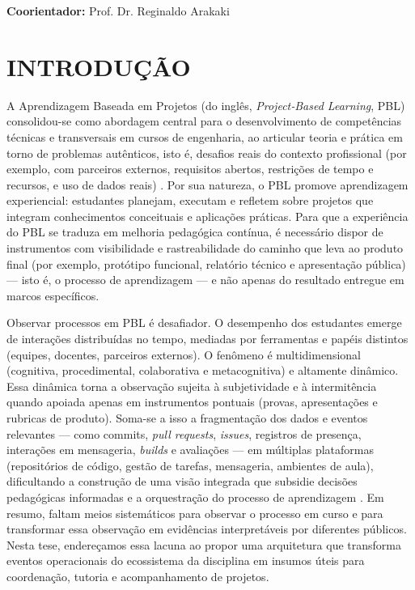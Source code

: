 \documentclass[12pt,a4paper]{article}
\begin{document}
\bigskip

\noindent \textbf{Coorientador:} Prof. Dr. Reginaldo Arakaki

\bigskip


\newpage
\thispagestyle{empty}
\tableofcontents


\newpage
\hypersetup{pageanchor=true,hypertexnames=false}
\pagestyle{plain}
\renewcommand{\baselinestretch}{1.5}

\normalsize

\section{INTRODUÇÃO}

A Aprendizagem Baseada em Projetos (do inglês, \textit{Project‑Based Learning}, PBL) consolidou-se como abordagem central para o desenvolvimento de competências técnicas e transversais em cursos de engenharia, ao articular teoria e prática em torno de problemas autênticos, isto é, desafios reais do contexto profissional (por exemplo, com parceiros externos, requisitos abertos, restrições de tempo e recursos, e uso de dados reais) \cite{zhang2023, lavado2024, guo2020}. Por sua natureza, o PBL promove aprendizagem experiencial: estudantes planejam, executam e refletem sobre projetos que integram conhecimentos conceituais e aplicações práticas. Para que a experiência do PBL se traduza em melhoria pedagógica contínua, é necessário dispor de instrumentos com visibilidade e rastreabilidade do caminho que leva ao produto final (por exemplo, protótipo funcional, relatório técnico e apresentação pública) — isto é, o processo de aprendizagem — e não apenas do resultado entregue em marcos específicos.

Observar processos em PBL é desafiador. O desempenho dos estudantes emerge de interações distribuídas no tempo, mediadas por ferramentas e papéis distintos (equipes, docentes, parceiros externos). O fenômeno é multidimensional (cognitiva, procedimental, colaborativa e metacognitiva) e altamente dinâmico. Essa dinâmica torna a observação sujeita à subjetividade e à intermitência quando apoiada apenas em instrumentos pontuais (provas, apresentações e rubricas de produto). Soma-se a isso a fragmentação dos dados e eventos relevantes — como commits, \textit{pull requests}, \textit{issues}, registros de presença, interações em mensageria, \textit{builds} e avaliações — em múltiplas plataformas (repositórios de código, gestão de tarefas, mensageria, ambientes de aula), dificultando a construção de uma visão integrada que subsidie decisões pedagógicas informadas e a orquestração do processo de aprendizagem \cite{romero2010, romero2020}. Em resumo, faltam meios sistemáticos para observar o processo em curso e para transformar essa observação em evidências interpretáveis por diferentes públicos. Nesta tese, endereçamos essa lacuna ao propor uma arquitetura que transforma eventos operacionais do ecossistema da disciplina em insumos úteis para coordenação, tutoria e acompanhamento de projetos.
\end{document}
